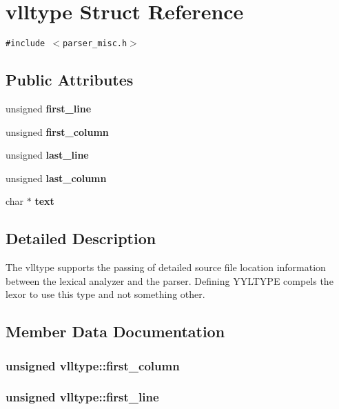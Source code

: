 \section{vlltype Struct Reference}
\label{structvlltype}
{\tt \#include $<$parser\_\-misc.h$>$}

\subsection*{Public Attributes}
\begin{CompactItemize}
\item 
unsigned {\bf first\_\-line}
\item 
unsigned {\bf first\_\-column}
\item 
unsigned {\bf last\_\-line}
\item 
unsigned {\bf last\_\-column}
\item 
char $\ast$ {\bf text}
\end{CompactItemize}


\subsection{Detailed Description}
The vlltype supports the passing of detailed source file location information between the lexical analyzer and the parser. Defining YYLTYPE compels the lexor to use this type and not something other. 



\subsection{Member Data Documentation}
\subsubsection{\setlength{\rightskip}{0pt plus 5cm}unsigned {\bf vlltype::first\_\-column}}\label{structvlltype_o1}


\subsubsection{\setlength{\rightskip}{0pt plus 5cm}unsigned {\bf vlltype::first\_\-line}}\label{structvlltype_o0}


